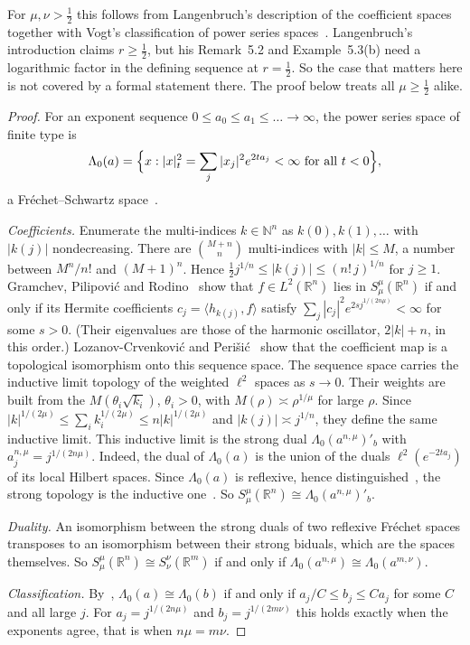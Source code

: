 \documentclass[11pt]{article}
\theoremstyle{definition}
\begin{document}
For $\mu, \nu > \frac12$ this follows from Langenbruch's description of the coefficient
spaces~\cite[Example~5.3(b)]{lang} together with Vogt's classification of power series
spaces~\cite[Thm.~5.12]{vogt}. Langenbruch's introduction claims $r \ge \frac12$, but his
Remark~5.2 and Example~5.3(b) need a logarithmic factor in the defining sequence at
$r = \frac12$. So the case that matters here is not covered by a formal statement there. The
proof below treats all $\mu \ge \frac12$ alike.

\begin{proof}
  For an exponent sequence $0 \le a_0 \le a_1 \le \dots \to \infty$, the power series space of
  finite type is
  \[
    \Lambda_0(a) = \Bigl\{x : |x|_t^2 = \sum_j |x_j|^2 e^{2ta_j} < \infty \text{ for all } t < 0
    \Bigr\},
  \]
  a Fr\'echet--Schwartz space~\cite[Thm.~5.8]{vogt}.

  \emph{Coefficients.} Enumerate the multi-indices $k \in \mathbb N^n$ as $k(0), k(1), \dots$
  with $|k(j)|$ nondecreasing. There are $\binom{M+n}{n}$ multi-indices with $|k| \le M$, a
  number between $M^n/n!$ and $(M+1)^n$. Hence $\frac12 j^{1/n} \le |k(j)| \le (n!\,j)^{1/n}$
  for $j \ge 1$. Gramchev, Pilipovi\'c and Rodino~\cite[Thm.~1.2]{gpr} show that
  $f \in L^2(\mathbb R^n)$ lies in $S^\mu_\mu(\mathbb R^n)$ if and only if its Hermite
  coefficients $c_j = \langle h_{k(j)}, f\rangle$ satisfy
  $\sum_j |c_j|^2 e^{2s j^{1/(2n\mu)}} < \infty$ for some $s > 0$. (Their eigenvalues are those of
  the harmonic oscillator, $2|k| + n$, in this order.) Lozanov-Crvenkovi\'c and
  Peri\v{s}i\'c~\cite[Thm.~2.3]{lcp} show that the coefficient map is a topological isomorphism
  onto this sequence space. The sequence space carries the inductive limit topology of the
  weighted $\ell^2$ spaces as $s \to 0$. Their weights are built from the
  $M(\theta_i\sqrt{k_i})$, $\theta_i > 0$, with $M(\rho) \asymp \rho^{1/\mu}$ for large $\rho$.
  Since $|k|^{1/(2\mu)} \le \sum_i k_i^{1/(2\mu)} \le n|k|^{1/(2\mu)}$ and
  $|k(j)| \asymp j^{1/n}$, they define the same inductive limit. This inductive limit is the
  strong dual $\Lambda_0(a^{n,\mu})'_b$ with $a^{n,\mu}_j = j^{1/(2n\mu)}$. Indeed, the dual of
  $\Lambda_0(a)$ is the union of the duals $\ell^2(e^{-2ta_j})$ of its local Hilbert spaces.
  Since $\Lambda_0(a)$ is reflexive, hence distinguished~\cite[Thms.~3.3, 2.8]{vogt}, the strong
  topology is the inductive one~\cite[Sec.~2]{vogt}. So
  $S^\mu_\mu(\mathbb R^n) \cong \Lambda_0(a^{n,\mu})'_b$.

  \emph{Duality.} An isomorphism between the strong duals of two reflexive Fr\'echet spaces
  transposes to an isomorphism between their strong biduals, which are the spaces themselves.
  So $S^\mu_\mu(\mathbb R^n) \cong S^\nu_\nu(\mathbb R^m)$ if and only if
  $\Lambda_0(a^{n,\mu}) \cong \Lambda_0(a^{m,\nu})$.

  \emph{Classification.} By~\cite[Thm.~5.12]{vogt}, $\Lambda_0(a) \cong \Lambda_0(b)$ if and
  only if $a_j/C \le b_j \le Ca_j$ for some $C$ and all large $j$. For $a_j = j^{1/(2n\mu)}$ and
  $b_j = j^{1/(2m\nu)}$ this holds exactly when the exponents agree, that is when
  $n\mu = m\nu$.
\end{proof}
\end{document}
